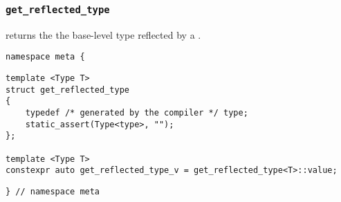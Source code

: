 
\subsubsection{\texttt{get\_reflected\_type}}

returns the the base-level type reflected by a .

\begin{verbatim}
namespace meta {
\end{verbatim}
\begin{verbatim}
template <Type T>
struct get_reflected_type
{
	typedef /* generated by the compiler */ type;
	static_assert(Type<type>, "");
};
	
template <Type T>
constexpr auto get_reflected_type_v = get_reflected_type<T>::value;
\end{verbatim}
\begin{verbatim}
} // namespace meta
\end{verbatim}
